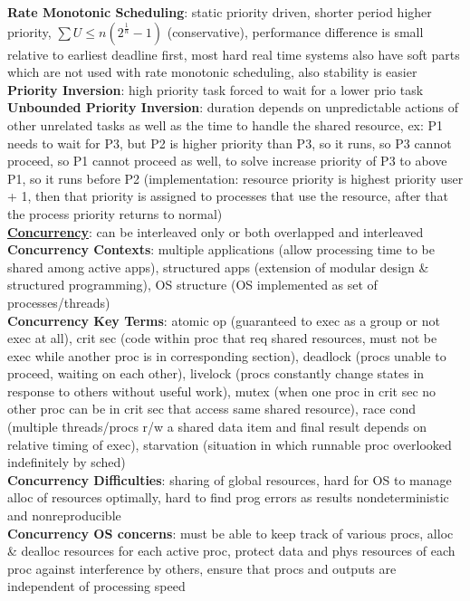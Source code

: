 \documentclass[a4paper]{article}
\begin{document}
\begin{multicols}{2}
        \textbf{Rate Monotonic Scheduling}: static priority driven, shorter period higher priority, $\sum U \leq n(2^{\frac{1}{n}}-1)$ (conservative), performance difference is small relative to earliest deadline first, most hard real time systems also have soft parts which are not used with rate monotonic scheduling, also stability is easier\\
        \textbf{Priority Inversion}: high priority task forced to wait for a lower prio task\\
        \textbf{Unbounded Priority Inversion}: duration depends on unpredictable actions of other unrelated tasks as well as the time to handle the shared resource, ex: P1 needs to wait for P3, but P2 is higher priority than P3, so it runs, so P3 cannot proceed, so P1 cannot proceed as well, to solve increase priority of P3 to above P1, so it runs before P2 (implementation: resource priority is highest priority user + 1, then that priority  is assigned to processes that use the resource, after that the process priority returns to normal)\\
        \underline{\textbf{Concurrency}}: can be interleaved only or both overlapped and interleaved\\
        \textbf{Concurrency Contexts}: multiple applications (allow processing time to be shared among active apps), structured apps (extension of modular design \& structured programming), OS structure (OS implemented as set of processes/threads)\\
        \textbf{Concurrency Key Terms}: atomic op (guaranteed to exec as a group or not exec at all), crit sec (code within proc that req shared resources, must not be exec while another proc is in corresponding section), deadlock (procs unable to proceed, waiting on each other), livelock (procs constantly change states in response to others without useful work), mutex (when one proc in crit sec no other proc can be in crit sec that access same shared resource), race cond (multiple threads/procs r/w a shared data item and final result depends on relative timing of exec), starvation (situation in which runnable proc overlooked indefinitely by sched)\\
        \textbf{Concurrency Difficulties}: sharing of global resources, hard for OS to manage alloc of resources optimally, hard to find prog errors as results nondeterministic and nonreproducible\\
        \textbf{Concurrency OS concerns}: must be able to keep track of various procs, alloc \& dealloc resources for each active proc, protect data and phys resources of each proc against interference by others, ensure that procs and outputs are independent of processing speed\\

\end{multicols}
\end{document}

